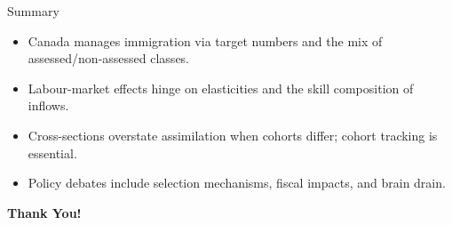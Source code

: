 \documentclass[aspectratio=169]{beamer}
\begin{document}
\begin{frame}{Summary}
\transfade
\begin{itemize}[<+->]
  \item Canada manages immigration via target numbers and the mix of assessed/non-assessed classes.
  \item Labour-market effects hinge on elasticities and the skill composition of inflows.
  \item Cross-sections overstate assimilation when cohorts differ; cohort tracking is essential.
  \item Policy debates include selection mechanisms, fiscal impacts, and brain drain.
\end{itemize}
\end{frame}

\begin{frame}
\centering
\Huge{\textbf{Thank You!}} \\

\end{frame}
\end{document}
